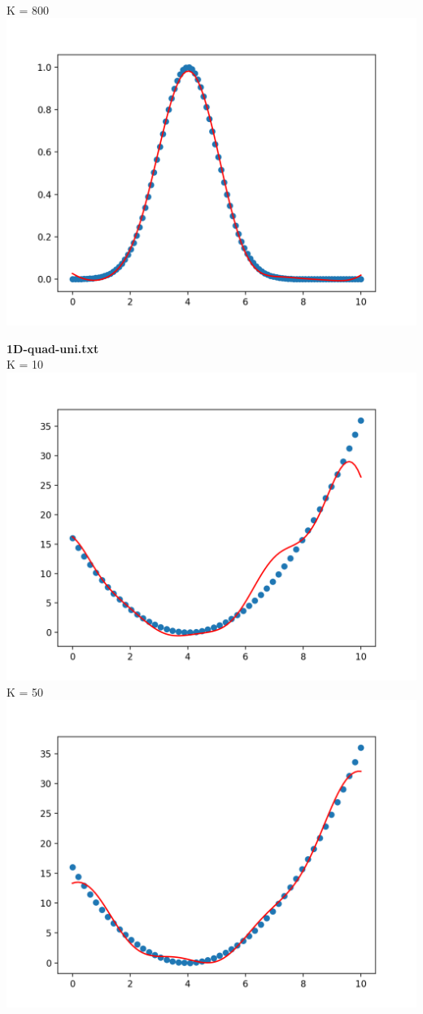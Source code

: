 \documentclass[12pt]{article}
\newcommand{\nextproblem}{
	\vfill
	\pagebreak
}
\begin{document}
\begin{enumerate}
\begin{enumerate}
	\\ K = 800
	\\ \includegraphics[height=0.3\textheight]{1Dexpuni800}
	\nextproblem
	\textbf{1D-quad-uni.txt}
	\\ K = 10
	\\ \includegraphics[height=0.3\textheight]{1Dquaduni10}
	\\ K = 50
	\\ \includegraphics[height=0.3\textheight]{1Dquaduni50}

\end{enumerate}
\end{enumerate}
\end{document}
